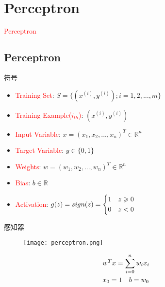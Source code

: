\section{Perceptron}
\label{sec:perceptron}

\begin{frame}
  \begin{center}
    \Huge{\textcolor{red}{Perceptron}}
  \end{center}
\end{frame}

\subsection{Perceptron}

\begin{frame}[fragile]{符号}
 \begin{itemize}
   \item \textcolor{red}{Training Set}: $ S = \{ ({x^{(i)}},{y^{(i)}});i = 1,2,...,m\} $
   \item \textcolor{red}{Training Example($i_{th}$)}: $ ({x^{(i)}},{y^{(i)}}) $
   \item \textcolor{red}{Input Variable}: $ x = ({x_1},{x_2},...,{x_n})^{T} \in {\mathbb{R}^n} $
   \item \textcolor{red}{Target Variable}: $ y \in \{0,1\} $
   \item \textcolor{red}{Weights}: $ w = ({w_1},{w_2},...,{w_n})^{T} \in {\mathbb{R}^n} $   
   \item \textcolor{red}{Bias}: $ b \in \mathbb{R} $      
   \item \textcolor{red}{Activation}: $ 
g(z)=sign(z)= \left\{ \begin{gathered}
  1 \quad z \geqslant 0 \hfill \\
  0 \quad z < 0 \hfill \\ 
\end{gathered}  \right.
$   
 \end{itemize}
\end{frame}

\begin{frame}{感知器}
  \begin{figure}
    \centering
    \texttt{[image: perceptron.png]}
  \end{figure}

\[\begin{gathered}
  {w^T}x = \sum\limits_{i = 0}^n {{w_i}{x_i}}  \hfill \\
  {x_0} = 1 \quad b = {w_0} \hfill \\ 
\end{gathered} \]
\end{frame}

